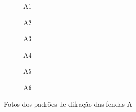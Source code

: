 \begin{figure}[H]
    \centering

    \begin{subfigure}[t]{.45\textwidth}
        \centering
        
        \caption{A1}
        \label{fig:A1}
    \end{subfigure}
    \qquad
    \begin{subfigure}[t]{.45\textwidth}
        \centering
        
        \caption{A2}
        \label{fig:A2}
    \end{subfigure}
    \qquad
    \begin{subfigure}[t]{.45\textwidth}
        \centering
        
        \caption{A3}
        \label{fig:A3}
    \end{subfigure}
    \qquad
    \begin{subfigure}[t]{.45\textwidth}
        \centering
        
        \caption{A4}
        \label{fig:A4}
    \end{subfigure}
    \qquad
    \begin{subfigure}[t]{.45\textwidth}
        \centering
        
        \caption{A5}
        \label{fig:A5}
    \end{subfigure}
    \qquad
    \begin{subfigure}[t]{.45\textwidth}
        \centering
        
        \caption{A6}
        \label{fig:A6}
    \end{subfigure}

    \caption{Fotos dos padrões de difração das fendas A}
    \label{fig:A}
\end{figure}